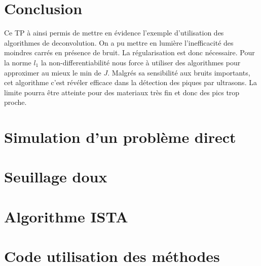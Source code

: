 \documentclass[12pt,a4paper,titlepage]{article}
\begin{document}
\section*{Conclusion}
Ce TP à ainsi permis de mettre en évidence l'exemple d'utilisation des algorithmes de deconvolution. On a pu mettre en lumière l'inefficacité des moindres carrés en présence de bruit. La régularisation est donc nécessaire. Pour la norme $l_1$ la non-differentiabilité nous force à utiliser des algorithmes pour approximer au mieux le min de $J$. Malgrés sa sensibilité aux bruits importants, cet algorithme c'est révéler efficace dans la détection des piques par ultrasons. La limite pourra être atteinte pour des materiaux très fin et donc des pics trop proche.
\pagebreak

\begin{appendices}
  \section{Simulation d'un problème direct}
    
  \section{Seuillage doux}
    
  \section{Algorithme ISTA}
    
  \section{Code utilisation des méthodes }
    
\end{appendices}
  
\end{document}
